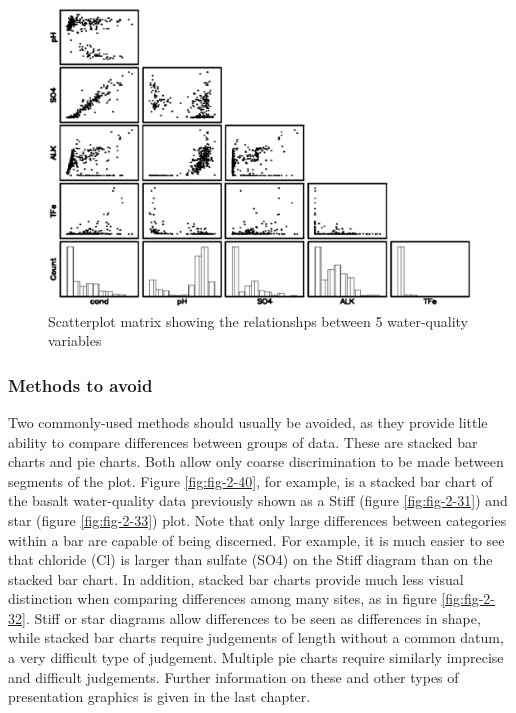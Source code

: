 \documentclass[]{book}
\begin{document}
\begin{figure}

{\centering \includegraphics[width=14.86in]{figures/2_39} 

}

\caption{Scatterplot matrix showing the relationshps between 5 water-quality variables}\label{fig:fig-2-39}
\end{figure}

\hypertarget{methods-to-avoid}{%
\subsubsection{Methods to avoid}\label{methods-to-avoid}}

Two commonly-used methods should usually be avoided, as they provide little ability to compare differences between groups of data. These are stacked bar charts and pie charts. Both allow only coarse discrimination to be made between segments of the plot. Figure \ref{fig:fig-2-40}, for example, is a stacked bar chart of the basalt water-quality data previously shown as a Stiff (figure \ref{fig:fig-2-31}) and star (figure \ref{fig:fig-2-33}) plot. Note that only large differences between categories within a bar are capable of being discerned. For example, it is much easier to see that chloride (Cl) is larger than sulfate (SO4) on the Stiff diagram than on the stacked bar chart. In addition, stacked bar charts provide much less visual distinction when comparing differences among many sites, as in figure \ref{fig:fig-2-32}. Stiff or star diagrams allow differences to be seen as differences in shape, while stacked bar charts require judgements of length without a common datum, a very difficult type of judgement. Multiple pie charts require similarly imprecise and difficult judgements. Further information on these and other types of presentation graphics is given in the last chapter.
\end{document}
